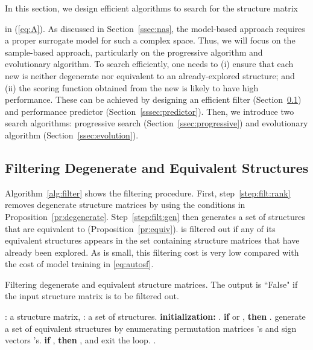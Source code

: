 \documentclass[10pt,journal,compsoc]{IEEEtran}
\begin{document}
In this section, 
we 
design efficient 
algorithms 
to search  for
the structure matrix 
 
in (\ref{eq:A}).
As discussed in Section~\ref{ssec:nas},
 the
model-based approach
requires a proper surrogate model for such a complex space.
Thus,
we will focus on the sample-based approach, particularly on 
the progressive algorithm 
and evolutionary algorithm.
To search efficiently, 
one needs to (i) ensure that each new  is neither 
degenerate 
nor equivalent to an already-explored structure; and (ii) the
scoring function  obtained from the new  is likely
to have high
performance.
These can be achieved by designing an efficient filter
(Section~\ref{ssec:filter}) and performance predictor
(Section~\ref{sssec:predictor}).
Then, we introduce two search algorithms: progressive search
(Section~\ref{ssec:progressive})
and evolutionary
algorithm
(Section~\ref{ssec:evolution}).




\subsection{Filtering Degenerate and Equivalent Structures}
\label{ssec:filter}

Algorithm~\ref{alg:filter} shows the filtering procedure.
First,
step~\ref{step:filt:rank}
removes
degenerate structure matrices 
by
using the conditions in Proposition~\ref{pr:degenerate}.
Step~\ref{step:filt:gen} then generates a set of  structures that are equivalent to 
(Proposition~\ref{pr:equiv}).
 is filtered out
if any of its equivalent structures appears in the set 
 containing
structure matrices that have
already been explored.
As  is small,
this filtering 
cost 
is very low
compared with the cost of model training in \eqref{eq:autosf}.

\begin{algorithm}[ht]
	\caption{
		Filtering degenerate and equivalent structure matrices. The
		output is ``False" if the input structure matrix
		 is to be filtered out.}
	\label{alg:filter}
	\small
	\begin{algorithmic}[1]
		\REQUIRE : a  structure matrix, : a set of structures.
		\STATE \textbf{initialization:} .
		\STATE \textbf{if}  or 
		,
		\textbf{then} . \label{step:filt:rank}
		\STATE 
		generate a set of equivalent structures  by
		enumerating permutation matrices 's and sign vectors 's. \label{step:filt:gen}
		\STATE \textbf{if} ,  \textbf{then} ,
		and exit the loop.
		\label{step:filt:equiv}
		\ENDFOR
\RETURN .
	\end{algorithmic}
\end{algorithm}
\end{document}
